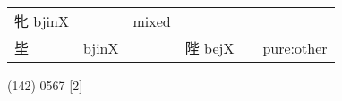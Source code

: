 \documentclass[14pt,a4paper]{scrartcl}
\begin{document}
\begin{longtable}[c]{@{}llllll@{}}
\begin{minipage}[t]{0.14\columnwidth}
牝 bjinX
\strut\end{minipage} &
\begin{minipage}[t]{0.14\columnwidth}\raggedright\strut
\strut\end{minipage} &
\begin{minipage}[t]{0.14\columnwidth}\raggedright\strut
mixed
\strut\end{minipage}\tabularnewline
\begin{minipage}[t]{0.14\columnwidth}\raggedright\strut
坒
\strut\end{minipage} &
\begin{minipage}[t]{0.14\columnwidth}\raggedright\strut
bjinX
\strut\end{minipage} &
\begin{minipage}[t]{0.14\columnwidth}\raggedright\strut
\strut\end{minipage} &
\begin{minipage}[t]{0.14\columnwidth}\raggedright\strut
陛 bejX
\strut\end{minipage} &
\begin{minipage}[t]{0.14\columnwidth}\raggedright\strut
\strut\end{minipage} &
\begin{minipage}[t]{0.14\columnwidth}\raggedright\strut
pure:other
\strut\end{minipage}\tabularnewline
\bottomrule
\end{longtable}

(142) 0567 {[}2{]}
\end{document}

